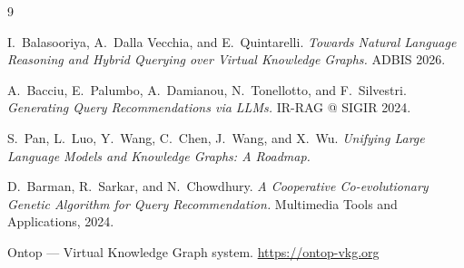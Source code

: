 \documentclass[11pt,a4paper,oneside]{book}
\begin{document}
\begin{thebibliography}{9}

I.~Balasooriya, A.~Dalla Vecchia, and E.~Quintarelli.
\textit{Towards Natural Language Reasoning and Hybrid Querying over Virtual Knowledge Graphs.}
ADBIS 2026.

A.~Bacciu, E.~Palumbo, A.~Damianou, N.~Tonellotto, and F.~Silvestri.
\textit{Generating Query Recommendations via LLMs.}
IR-RAG @ SIGIR 2024.

S.~Pan, L.~Luo, Y.~Wang, C.~Chen, J.~Wang, and X.~Wu.
\textit{Unifying Large Language Models and Knowledge Graphs: A Roadmap.}

D.~Barman, R.~Sarkar, and N.~Chowdhury.
\textit{A Cooperative Co-evolutionary Genetic Algorithm for Query Recommendation.}
Multimedia Tools and Applications, 2024.

Ontop --- Virtual Knowledge Graph system. \url{https://ontop-vkg.org}

\end{thebibliography}
\end{document}

